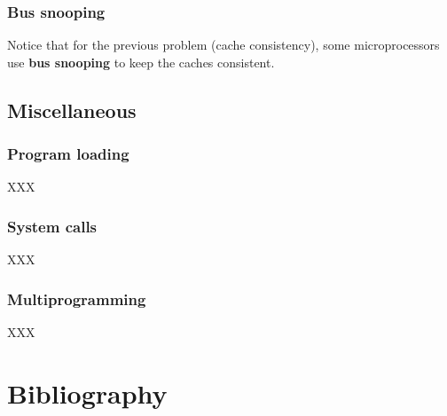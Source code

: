 
\begin{frame}
  \frametitle{Bus snooping}

  Notice that for the previous problem (cache consistency), some
  microprocessors use \textbf{bus snooping} to keep the caches
  consistent.

\end{frame}

%
%

\subsection{Miscellaneous}


\begin{frame}
  \frametitle{Program loading}

  XXX

\end{frame}


\begin{frame}
  \frametitle{System calls}

  XXX

\end{frame}


\begin{frame}
  \frametitle{Multiprogramming}

  XXX

\end{frame}

%
%

\section{Bibliography}

\begin{thebibliography}{4}


\end{thebibliography}


